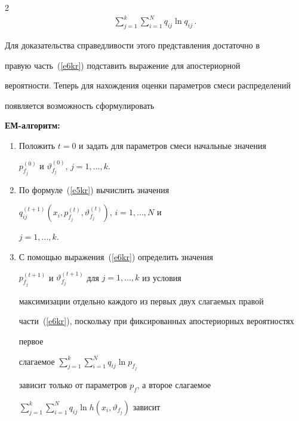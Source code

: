 \begin{multicols}{2}
\begin{multline}
 \sum\limits_{j=1}^k\sum\limits_{i=1}^N q_{ij} \ln q_{ij}\,.


     \label{e6kr}


     \end{multline}


     


     Для доказательства справедливости этого представления достаточно в 


правую часть~(\ref{e6kr}) подставить выражение для апостериорной 


вероятности. Теперь для нахождения оценки параметров смеси распределений 


появляется возможность сформулировать


\textbf{ЕМ-ал\-го\-ритм:}








\noindent


\begin{enumerate}[1.]


\item Положить $t=0$ и задать для параметров смеси начальные значения 


$p^{(0)}_{f_j}$ и $\vartheta^{(0)}_{f_j}$, $j=1,\ldots , k$. 


\item По формуле~(\ref{e5kr}) вычислить значения 


$q_{ij}^{(t+1)}\left ( x_i,p_{f_j}^{(t)}, \vartheta_{f_j}^{(t)}\right )$, $i=1,\ldots , N$ и 


$j=1,\ldots ,k$.


\item С помощью выражения~(\ref{e6kr}) определить значения 


$p_{f_j}^{(t+1)}$ и $\vartheta_{f_j}^{(t+1)}$ для $j=1,\ldots ,k$ из условия 


максимизации отдельно каждого из первых двух слагаемых правой 


части~(\ref{e6kr}), поскольку при фиксированных апостериорных вероятностях 


первое %


слагаемое $\sum\limits_{j=1}^k\sum\limits_{i=1}^N q_{ij}\ln p_{f_j}$ 


зависит только от па\-ра\-мет\-ров $p_f$, а второе слагаемое 


$\sum\limits_{j=1}^k\sum\limits_{i=1}^N q_{ij}\ln h(x_i,\vartheta_{f_j})$ зависит 



\end{enumerate}
\end{multicols}
